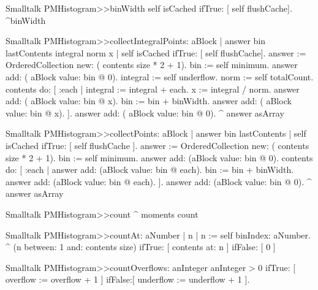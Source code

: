 \begin{displaycode}{Smalltalk}
PMHistogram>>binWidth
    self isCached
        ifTrue: [ self flushCache].
    ^binWidth
\end{displaycode}
  
\begin{displaycode}{Smalltalk}
PMHistogram>>collectIntegralPoints: aBlock
    | answer bin lastContents integral norm x |
    self isCached
        ifTrue: [ self flushCache].
    answer := OrderedCollection new: ( contents size * 2 + 1).
    bin := self minimum.
    answer add: ( aBlock value: bin @ 0).
    integral := self underflow.
    norm := self totalCount.
    contents do:
        [ :each |
          integral := integral + each.
          x := integral / norm.
          answer add: ( aBlock value: bin @ x).
          bin := bin + binWidth.
          answer add: ( aBlock value: bin @ x).
        ].
    answer add: ( aBlock value: bin @ 0).
    ^ answer asArray
\end{displaycode}
  
\begin{displaycode}{Smalltalk}
PMHistogram>>collectPoints: aBlock
    | answer bin lastContents |
    self isCached
        ifTrue: [ self flushCache ].
    answer := OrderedCollection new: ( contents size * 2 + 1).
    bin := self minimum.
    answer add: (aBlock value: bin @ 0).
    contents do:
        [ :each |
          answer add: (aBlock value: bin @ each).
          bin := bin + binWidth.
          answer add: (aBlock value: bin @ each).
        ].
    answer add: (aBlock value: bin @ 0).
    ^ answer asArray
\end{displaycode}
  
\begin{displaycode}{Smalltalk}
PMHistogram>>count
    ^ moments count
\end{displaycode}
  
\begin{displaycode}{Smalltalk}
PMHistogram>>countAt: aNumber
    | n |
    n := self binIndex: aNumber.
    ^ (n between: 1 and: contents size)
            ifTrue: [ contents at: n ]
            ifFalse: [ 0 ]
\end{displaycode}

\begin{displaycode}{Smalltalk}
PMHistogram>>countOverflows: anInteger
    anInteger > 0
        ifTrue: [ overflow := overflow + 1 ]
        ifFalse:[ underflow := underflow + 1 ].
\end{displaycode}
        
